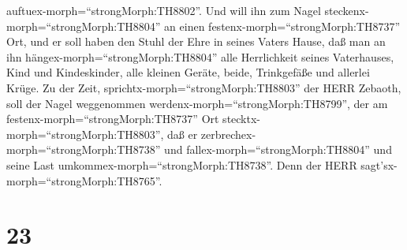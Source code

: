 auftuex-morph=``strongMorph:TH8802''.  Und will ihn zum
Nagel steckenx-morph=``strongMorph:TH8804'' an einen
festenx-morph=``strongMorph:TH8737'' Ort, und er soll haben den Stuhl
der Ehre in seines Vaters Hause,  daß man an ihn
hängex-morph=``strongMorph:TH8804'' alle Herrlichkeit seines
Vaterhauses, Kind und Kindeskinder, alle kleinen Geräte, beide,
Trinkgefäße und allerlei Krüge.  Zu der Zeit,
sprichtx-morph=``strongMorph:TH8803'' der HERR Zebaoth, soll der Nagel
weggenommen werdenx-morph=``strongMorph:TH8799'', der am
festenx-morph=``strongMorph:TH8737'' Ort
stecktx-morph=``strongMorph:TH8803'', daß er
zerbrechex-morph=``strongMorph:TH8738'' und
fallex-morph=``strongMorph:TH8804'' und seine Last
umkommex-morph=``strongMorph:TH8738''. Denn der HERR
sagt'sx-morph=``strongMorph:TH8765''.

\hypertarget{section-22}{%
\section{23}\label{section-22}}

